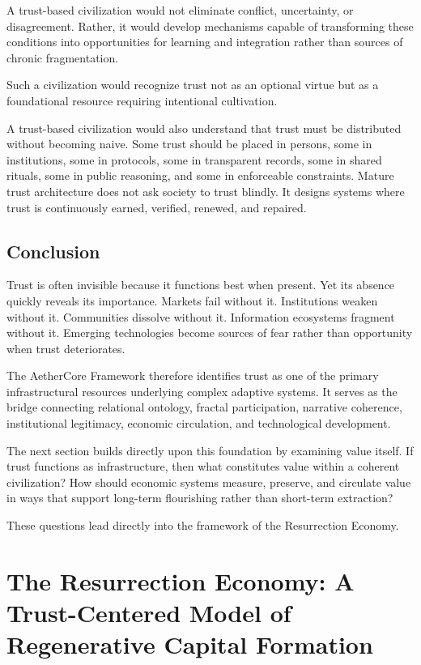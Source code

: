 \documentclass[12pt]{article}
\begin{document}
A trust-based civilization would not eliminate conflict, uncertainty, or disagreement. Rather, it would develop mechanisms capable of transforming these conditions into opportunities for learning and integration rather than sources of chronic fragmentation.

Such a civilization would recognize trust not as an optional virtue but as a foundational resource requiring intentional cultivation.

A trust-based civilization would also understand that trust must be distributed without becoming naive. Some trust should be placed in persons, some in institutions, some in protocols, some in transparent records, some in shared rituals, some in public reasoning, and some in enforceable constraints. Mature trust architecture does not ask society to trust blindly. It designs systems where trust is continuously earned, verified, renewed, and repaired.

\subsection{Conclusion}

Trust is often invisible because it functions best when present. Yet its absence quickly reveals its importance. Markets fail without it. Institutions weaken without it. Communities dissolve without it. Information ecosystems fragment without it. Emerging technologies become sources of fear rather than opportunity when trust deteriorates.

The AetherCore Framework therefore identifies trust as one of the primary infrastructural resources underlying complex adaptive systems. It serves as the bridge connecting relational ontology, fractal participation, narrative coherence, institutional legitimacy, economic circulation, and technological development.

The next section builds directly upon this foundation by examining value itself. If trust functions as infrastructure, then what constitutes value within a coherent civilization? How should economic systems measure, preserve, and circulate value in ways that support long-term flourishing rather than short-term extraction?

These questions lead directly into the framework of the Resurrection Economy.

\section{The Resurrection Economy: A Trust-Centered Model of Regenerative Capital Formation}
\end{document}
